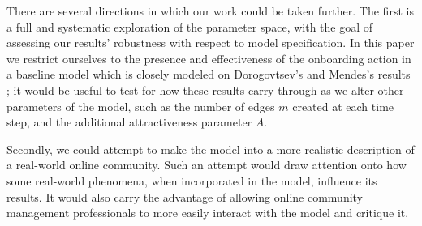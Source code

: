 \documentclass{bmcart}
\begin{document}
There are several directions in which our work could be taken further. The first is a full and systematic exploration of the parameter space, with the goal of assessing our results' robustness with respect to model specification. In this paper we restrict ourselves to the presence and effectiveness of the onboarding action in a baseline model which is closely modeled on Dorogovtsev's and Mendes's results \cite{dorogovtsev2002evolution}; it would be useful to test for how these results carry through as we alter other parameters of the model, such as the number of edges $m$ created at each time step, and the additional attractiveness parameter $A$. 

Secondly, we could attempt to make the model into a more realistic description of a real-world online community. Such an attempt would draw attention onto how some real-world phenomena, when incorporated in the model, influence its results. It would also carry the advantage of allowing online community management professionals to more easily interact with the model and critique it. 



\end{document}
